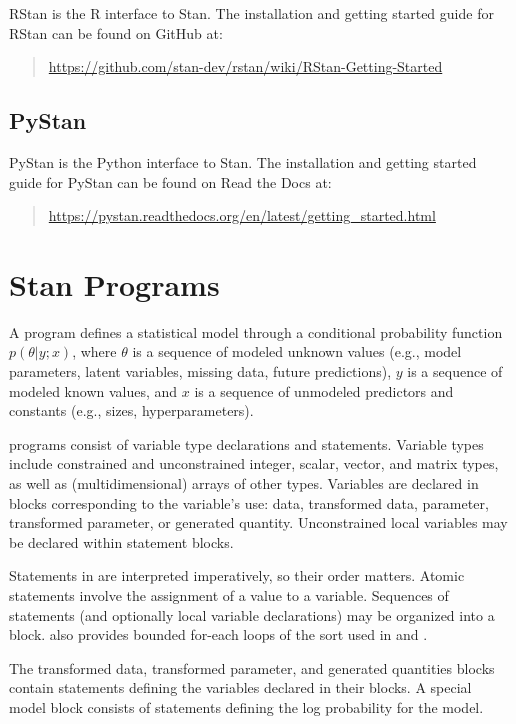 RStan is the R interface to Stan.  The installation and getting
started guide for RStan can be found on GitHub at:

\begin{quote}
\url{https://github.com/stan-dev/rstan/wiki/RStan-Getting-Started}
\end{quote}

\subsection{PyStan}

PyStan is the Python interface to Stan.  The installation and getting
started guide for PyStan can be found on Read the Docs at:

\begin{quote}
\url{https://pystan.readthedocs.org/en/latest/getting_started.html}
\end{quote}



\section{Stan Programs}

A \Stan program defines a statistical model through a conditional
probability function $p(\theta|y;x)$, where $\theta$ is a sequence of
modeled unknown values (e.g., model parameters, latent variables, missing
data, future predictions), $y$ is a sequence of modeled known 
values, and $x$ is a sequence of unmodeled predictors and constants
(e.g., sizes, hyperparameters).

\Stan programs consist of variable type declarations and statements.
Variable types include constrained and unconstrained integer, scalar,
vector, and matrix types, as well as (multidimensional) arrays of
other types.  Variables are declared in blocks corresponding to the
variable's use: data, transformed data, parameter, transformed
parameter, or generated quantity.  Unconstrained local variables may
be declared within statement blocks.

Statements in \Stan are interpreted imperatively, so their order
matters.  Atomic statements involve the assignment of a value to a
variable.  Sequences of statements (and optionally local variable
declarations) may be organized into a block.  \Stan also provides bounded
for-each loops of the sort used in \R and \BUGS.

The transformed data, transformed parameter, and generated quantities
blocks contain statements defining the variables declared in their
blocks.  A special model block consists of statements defining the log
probability for the model.

